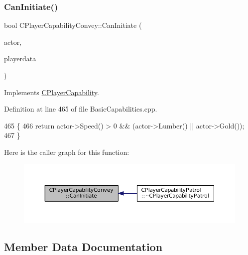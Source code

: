 \subsubsection{\texorpdfstring{Can\+Initiate()}{CanInitiate()}}
{\footnotesize\ttfamily bool C\+Player\+Capability\+Convey\+::\+Can\+Initiate (\begin{DoxyParamCaption}\item[{std\+::shared\+\_\+ptr$<$ \hyperlink{classCPlayerAsset}{C\+Player\+Asset} $>$}]{actor,  }\item[{std\+::shared\+\_\+ptr$<$ \hyperlink{classCPlayerData}{C\+Player\+Data} $>$}]{playerdata }\end{DoxyParamCaption})\hspace{0.3cm}{\ttfamily [virtual]}}



Implements \hyperlink{classCPlayerCapability_aa83b1e1fcaff2985c378132d679154ea}{C\+Player\+Capability}.



Definition at line 465 of file Basic\+Capabilities.\+cpp.


\begin{DoxyCode}
465                                                                                                            
                \{
466     \textcolor{keywordflow}{return} actor->Speed() > 0 && (actor->Lumber() || actor->Gold());
467 \}
\end{DoxyCode}
Here is the caller graph for this function\+:
\nopagebreak
\begin{figure}[H]
\begin{center}
\leavevmode
\includegraphics[width=350pt]{classCPlayerCapabilityConvey_a6c5ebd62a9c3a619c56e070aca5443a7_icgraph}
\end{center}
\end{figure}


\subsection{Member Data Documentation}
\hypertarget{classCPlayerCapabilityConvey_ad04d0065f16c9cbef01832f5a071246d}{}\label{classCPlayerCapabilityConvey_ad04d0065f16c9cbef01832f5a071246d} 
